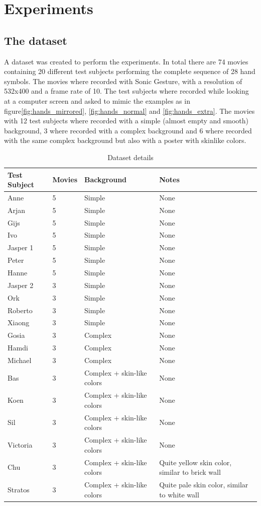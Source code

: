 \chapter{Experiments}
\label{ch:experiments}


\section{The dataset}
A dataset was created to perform the experiments. In total there are 74 movies containing 20 different test subjects performing the complete sequence of 28 hand symbols. The movies where recorded with Sonic Gesture, with a resolution of 532x400 and a frame rate of 10. The test subjects where recorded while looking at a computer screen and asked to mimic the examples as in figure\ref{fig:hands_mirrored}, \ref{fig:hands_normal} and \ref{fig:hands_extra}. The movies with 12 test subjects where recorded with a simple (almost empty and smooth) background, 3 where recorded with a complex background and 6 where recorded with the same complex background but also with a poster with skinlike colors.

\begin{table}
\begin{tabular}{llll}
	Test Subject & Movies & Background & Notes \\
	\hline
	Anne     & 5 & Simple & None \\
	Arjan    & 5 & Simple & None \\
	Gijs     & 5 & Simple & None \\
	Ivo      & 5 & Simple & None \\
	Jasper 1 & 5 & Simple & None \\
	Peter    & 5 & Simple & None \\
	Hanne    & 5 & Simple & None \\

	Jasper 2 & 3 & Simple & None \\
	Ork      & 3 & Simple & None \\
	Roberto  & 3 & Simple & None \\
	Xiaong   & 3 & Simple & None \\
			
	Gosia    & 3 & Complex & None \\
	Hamdi    & 3 & Complex & None \\
	Michael  & 3 & Complex & None \\
	
	Bas      & 3 & Complex + skin-like colors & None \\
	Koen     & 3 & Complex + skin-like colors & None \\
	Sil      & 3 & Complex + skin-like colors & None \\
	Victoria & 3 & Complex + skin-like colors & None \\
	Chu      & 3 & Complex + skin-like colors & Quite yellow skin color, similar to brick wall \\
	Stratos  & 3 & Complex + skin-like colors & Quite pale skin color, similar to white wall \\
\end{tabular}
\caption{Dataset details}
\end{table}

